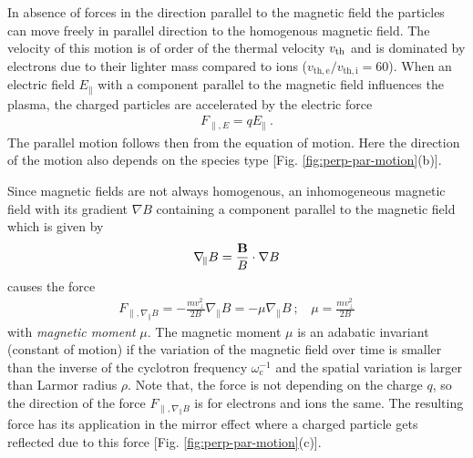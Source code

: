 In absence of forces in the direction parallel to the magnetic field the particles can move freely in parallel direction to the homogenous magnetic field. The velocity of this motion is of order of the thermal velocity $v_\mathrm{th}$ and is dominated by electrons due to their lighter mass compared to ions ($v_\mathrm{th,e}/v_\mathrm{th,i} = 60$). When an electric field $E_\parallel$ with a component parallel to the magnetic field influences the plasma, the charged particles are accelerated by the electric force
\begin{gather}
    F_{\parallel,E} = qE_\parallel~.
    \label{eq:forceElectricParallel}
\end{gather}
The parallel motion follows then from the equation of motion. Here the direction of the motion also depends on the species type [Fig. \ref{fig:perp-par-motion}(b)].\\\bigskip

Since magnetic fields are not always homogenous, an inhomogeneous magnetic field with its gradient $\nabla B$ containing a component parallel to the magnetic field which is given by
\begin{gather}
    \nabla_{\!\parallel} B = \frac{\boldsymbol{\mathbf{B}}}{B} \cdot \nabla B 
    \label{eq:forceMagneticParallel}
\end{gather}
causes the force
\begin{gather}
    F_{\parallel,\nabla_{\!\parallel} B} = - \frac{mv^2_{\perp}}{2B} \nabla_{\!\parallel} B = - \mu \nabla_{\!\parallel} B~;~~~~\mu = \frac{mv^2_{\perp}}{2B}
    \label{eq:magneticMoment}
\end{gather}
with \textit{magnetic moment} $\mu$. The magnetic moment $\mu$ is an adabatic invariant (constant of motion) if the variation of the magnetic field over time is smaller than the inverse of the cyclotron frequency $\omega^{-1}_\mathrm{c}$ and the spatial variation is larger than Larmor radius $\rho$. Note that, the force is not depending on the charge $q$, so the direction of the force $ F_{\parallel,\nabla_{\!\parallel} B}$ is for electrons and ions the same. The resulting force has its application in the mirror effect where a charged particle gets reflected due to this force [Fig. \ref{fig:perp-par-motion}(c)].

\newpage

